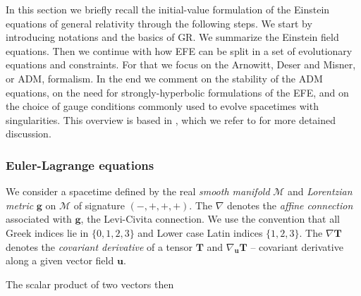 
In this section we briefly recall the initial-value formulation of the Einstein equations of general relativity through the following steps. 
We start by introducing notations and the basics of GR. 
We summarize the Einstein field equations. 
Then we continue with how EFE can be split in a set of evolutionary equations and constraints. 
For that we focus on the Arnowitt, Deser and Misner, or ADM, formalism. 
In the end we comment on the stability of the ADM equations, on the need for strongly-hyperbolic formulations of the EFE, and on the choice of gauge conditions commonly used to evolve spacetimes with singularities. 
This overview is based in \cite{Arnowitt:1962hi,Landau:1982dva,Wald:1984,Misner:1973,Baumgarte:2002jm}, which we refer to for more detained discussion.

\subsubsection{Euler-Lagrange equations}


We consider a spacetime defined by the real \textit{smooth manifold} $\mathcal{M}$ and \textit{Lorentzian metric} $\boldsymbol{g}$ on $\mathcal{M}$ of signature $(-,+,+,+)$. 
The $\nabla$ denotes the \textit{affine connection} associated with $\boldsymbol{g}$, the Levi-Civita connection.
We use the convention that all Greek indices lie in $\{0, 1, 2, 3\}$ and Lower case Latin indices $\{1, 2, 3\}$.
The $\nabla\boldsymbol{T}$ denotes the \textit{covariant derivative} of a tensor $\boldsymbol{T}$ and $\nabla_{\boldsymbol{u}}\boldsymbol{T}$ -- covariant derivative along a given vector field $\boldsymbol{u}$.

The scalar product of two vectors then 

